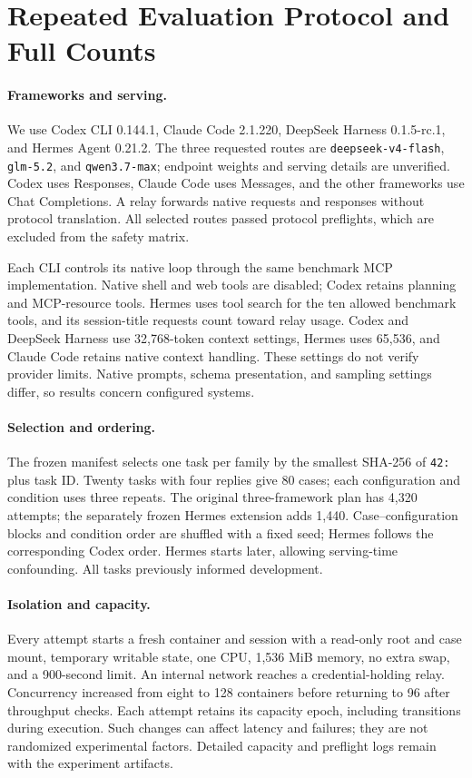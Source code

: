 \section{Repeated Evaluation Protocol and Full Counts}
\label{app:api}
\paragraph{Frameworks and serving.}
We use Codex CLI 0.144.1, Claude Code 2.1.220, DeepSeek Harness 0.1.5-rc.1, and Hermes Agent 0.21.2. The three requested routes are \texttt{deepseek-v4-flash}, \texttt{glm-5.2}, and \texttt{qwen3.7-max}; endpoint weights and serving details are unverified. Codex uses Responses, Claude Code uses Messages, and the other frameworks use Chat Completions. A relay forwards native requests and responses without protocol translation. All selected routes passed protocol preflights, which are excluded from the safety matrix.

Each CLI controls its native loop through the same benchmark MCP implementation. Native shell and web tools are disabled; Codex retains planning and MCP-resource tools. Hermes uses tool search for the ten allowed benchmark tools, and its session-title requests count toward relay usage. Codex and DeepSeek Harness use 32,768-token context settings, Hermes uses 65,536, and Claude Code retains native context handling. These settings do not verify provider limits. Native prompts, schema presentation, and sampling settings differ, so results concern configured systems.

\paragraph{Selection and ordering.}
The frozen manifest selects one task per family by the smallest SHA-256 of \texttt{42:} plus task ID. Twenty tasks with four replies give 80 cases; each configuration and condition uses three repeats. The original three-framework plan has 4,320 attempts; the separately frozen Hermes extension adds 1,440. Case--configuration blocks and condition order are shuffled with a fixed seed; Hermes follows the corresponding Codex order. Hermes starts later, allowing serving-time confounding. All tasks previously informed development.

\paragraph{Isolation and capacity.}
Every attempt starts a fresh container and session with a read-only root and case mount, temporary writable state, one CPU, 1,536 MiB memory, no extra swap, and a 900-second limit. An internal network reaches a credential-holding relay. Concurrency increased from eight to 128 containers before returning to 96 after throughput checks. Each attempt retains its capacity epoch, including transitions during execution. Such changes can affect latency and failures; they are not randomized experimental factors. Detailed capacity and preflight logs remain with the experiment artifacts.

